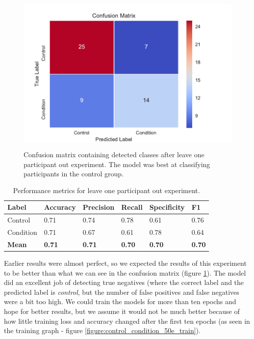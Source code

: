 \begin{figure}[h]
\begin{center}
      \includegraphics[height=8cm]{img/control_condition/leave_one_out.pdf}
      \caption{Confusion matrix containing detected classes after leave one participant out experiment. The model was best at classifying participants in the control group.}
      \label{figure:control_condition_conf_loo}
\end{center}
\end{figure}

\begin{table}[h]
\begin{center}
      \begin{tabular}{|l|l|l|l|l|l|}
            \hline
            \bfseries Label & \bfseries Accuracy & \bfseries Precision & \bfseries Recall & \bfseries Specificity & \bfseries F1 \\\hline
            Control & 0.71 & 0.74 & 0.78 & 0.61 & 0.76 \\\hline
            Condition & 0.71 & 0.67 & 0.61 & 0.78 & 0.64 \\\hline
            \bfseries Mean & \bfseries 0.71 & \bfseries 0.71 & \bfseries 0.70 & \bfseries 0.70 & \bfseries 0.70 \\\hline
      \end{tabular}
      \caption{Performance metrics for leave one participant out experiment.}
      \label{table:control_condition_performance_loo}
\end{center}
\end{table}

Earlier results were almost perfect, so we expected the results of this experiment to be better than what we can see in the confusion matrix (figure \ref{figure:control_condition_conf_loo}). The model did an excellent job of detecting true negatives (where the correct label and the predicted label is \textit{control}, but the number of false positives and false negatives were a bit too high. We could train the models for more than ten epochs and hope for better results, but we assume it would not be much better because of how little training loss and accuracy changed after the first ten epochs (as seen in the training graph - figure \ref{figure:control_condition_50e_train}). 

